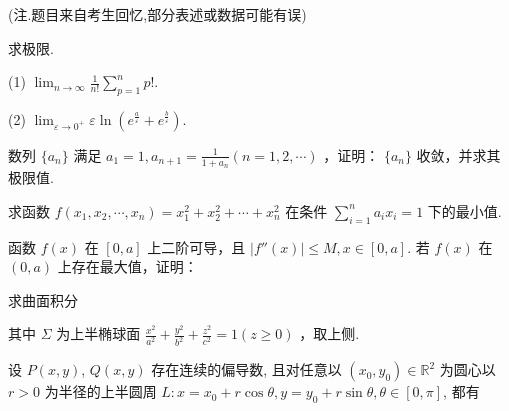 (注.题目来自考生回忆,部分表述或数据可能有误)\par
求极限.\par
(1) $\lim_{n\to \infty}\frac{1}{n!}\sum_{p = 1}^{n}p!$.\par
(2) $\lim_{\varepsilon \to 0^{+}}\varepsilon \ln \left(e^{\frac{a}{\varepsilon}} + e^{\frac{b}{\varepsilon}}\right).$\par
数列  $\{a_{n}\}$  满足  $a_{1}=1, a_{n+1}=\frac{1}{1+a_{n}}(n=1,2,\cdots)$ ，证明： $\{a_{n}\}$  收敛，并求其极限值.\par
求函数  $f(x_{1}, x_{2}, \cdots, x_{n}) = x_{1}^{2} + x_{2}^{2} + \cdots + x_{n}^{2}$  在条件  $\sum_{i=1}^{n} a_{i} x_{i} = 1$  下的最小值.\par
\par{}
函数 $f(x)$ 在 $[0, a]$ 上二阶可导，且 $|f''(x)| \leq M, x \in [0, a]$. 若 $f(x)$ 在 $(0, a)$ 上存在最大值，证明：\par
\nopagebreak[4]
\par{}
求曲面积分\par
\nopagebreak[4]
其中 $\Sigma$ 为上半椭球面 $\frac{x^2}{a^2} +\frac{y^2}{b^2} +\frac{z^2}{c^2} = 1(z\geq 0)$ ，取上侧.\par
\par{}
设 $P(x, y)$, $Q(x, y)$ 存在连续的偏导数, 且对任意以 $(x_0, y_0) \in \mathbb{R}^2$ 为圆心以 $r > 0$ 为半径的上半圆周 $L: x = x_0 + r\cos \theta, y = y_0 + r\sin \theta, \theta \in [0, \pi]$, 都有\par
